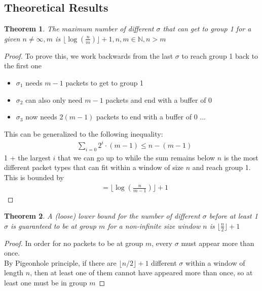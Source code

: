 \documentclass[conference]{IEEEtran}
\newtheorem{theorem}{Theorem}
\begin{document}
\subsection{Theoretical Results}
\begin{theorem}
    The maximum number of different $\sigma$ that can get to group 1 for a given $n \neq \infty, m$ is $\lfloor \log \left ( \frac{n}{m} \right ) \rfloor + 1, n,m \in \mathbb{N}, n > m$
  \end{theorem}

\begin{proof}
To prove this, we work backwards from the last $\sigma$ to reach group 1 back to the first one
  \begin{itemize}
    \item $\sigma_1$ needs $m - 1$ packets to get to group 1
    \item $\sigma_2$ can also only need $m - 1$ packets and end with a buffer of 0
    \item $\sigma_3$ now needs $2(m - 1)$ packets to end with a buffer of 0 ...
  \end{itemize}
  This can be generalized to the following inequality:
  \begin{align}
                 &\sum_{i=0} 2^i \cdot (m - 1) \leq n - (m - 1)
  \end{align}
1 + the largest $i$ that we can go up to while the sum remains below $n$ is the
most different packet types that can fit within a window of size $n$ and reach group 1.  This is bounded by
\begin{align}
& = \lfloor \log \left( \frac{n}{m - 1} \right) \rfloor + 1
\end{align}
\end{proof}

\begin{theorem}
A (loose) lower bound for the number of different $\sigma$ before at least 1 $\sigma$ is guaranteed to be at group $m$ for a non-infinite size window $n$ is $\lfloor \frac{n}{2} \rfloor + 1$
\end{theorem}

\begin{proof}
In order for no packets to be at group $m$, every $\sigma$ must appear more than once. \\

By Pigeonhole principle, if there are $\lfloor n/2 \rfloor + 1$ different $\sigma$ within a window of length $n$, then at least one of them cannot have appeared more than once, so at least one must be in group $m$
\end{proof}
\end{document}
